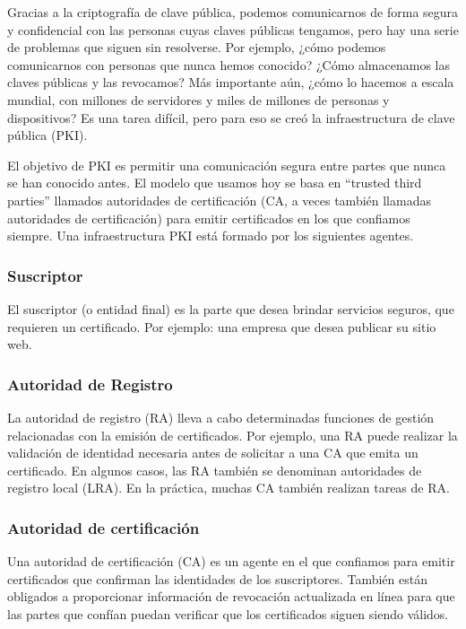 
Gracias a la criptografía de clave pública, podemos comunicarnos de forma 
segura y confidencial con 
las personas cuyas claves públicas tengamos, pero hay una serie de problemas 
que siguen sin resolverse. Por ejemplo, ¿cómo podemos comunicarnos con personas que 
nunca hemos conocido? ¿Cómo almacenamos las claves públicas y las revocamos? Más 
importante aún, ¿cómo lo hacemos a escala mundial, con millones de servidores y 
miles de millones de personas y dispositivos? Es una tarea difícil, pero para eso 
se creó la infraestructura de clave pública (PKI).

El objetivo de PKI es permitir una comunicación segura entre partes que nunca se 
han conocido antes. El modelo que usamos hoy se basa en “trusted third parties” 
llamados autoridades de certificación (CA, a veces también llamadas autoridades 
de certificación) para emitir certificados en los que confiamos siempre. Una 
infraestructura PKI está formado por los siguientes agentes.


\subsubsection*{Suscriptor}


El suscriptor (o entidad final) es la parte que desea brindar servicios 
seguros, que requieren un certificado. Por ejemplo: una empresa que desea 
publicar su sitio web.

\subsubsection*{Autoridad de Registro}

La autoridad de registro (RA) lleva a cabo determinadas funciones de gestión 
relacionadas con la emisión de certificados. Por ejemplo, una RA puede realizar 
la validación de identidad necesaria antes de solicitar a una CA que emita un 
certificado. En algunos casos, las RA también se denominan autoridades de 
registro local (LRA). En la práctica, muchas CA también realizan tareas de RA.

\subsubsection*{Autoridad de certificación}

Una autoridad de certificación (CA) es un agente en el que confiamos para emitir 
certificados que confirman las identidades de los suscriptores. También están 
obligados a proporcionar información de revocación actualizada en línea para 
que las partes que confían puedan verificar que los certificados siguen siendo válidos.

